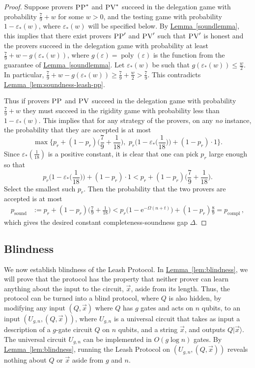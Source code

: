 \documentclass[11pt]{article}
\numberwithin{equation}{section}
\theoremstyle{definition}
\theoremstyle{plain}
\newcommand{\eee}{\mathrm e}
\newcommand{\expref}[2]{\hyperref[#2]{#1~\ref{#2}}}
\newcommand{\ket}[1]{|#1\rangle}
\DeclareMathOperator{\poly}{poly}
\DeclareMathOperator{\sound}{sound}
\DeclareMathOperator{\compl}{compl}
\newcommand{\eps}{\varepsilon}
\newcommand{\pv}{\textsc{PV}}
\newcommand{\pp}{\textsc{PP}}
\begin{document}
\begin{proof}
Suppose provers $\pp^*$ and $\pv^*$ succeed in the delegation game with probability $\frac79+w$ for some $w>0$, and the testing game with probability $1-\eps_*(w)$, where $\eps_*(w)$ will be specified below. By \expref{Lemma}{soundlemma}, this implies that there exist provers $\pp'$ and $\pv'$ such that $\pv'$ is honest and the provers succeed in the delegation game with probability at least $\frac79+w-g(\eps_*(w))$, where $g(\eps) = \poly(\eps)$ is the function from the guarantee of \expref{Lemma}{soundlemma}. Let $\eps_*(w)$ be such that $g(\eps_*(w)) \leq \frac{w}{2}$. In particular, $\frac79+w-g(\eps_*(w)) \geq \frac79+\frac{w}{2}>\frac79$. This contradicts \expref{Lemma}{lem:soundness-leash-pp}. 

Thus if provers $\pp$ and $\pv$ succeed in the delegation game with probability $\frac79+w$ they must succeed in the rigidity game with probability less than $1-\eps_*(w)$. 
This implies that for any strategy of the provers, on any \textit{no} instance, the probability that they are accepted is at most
\begin{equation}
\max\Big\{p_r+(1-p_r)\Big(\frac79+\frac{1}{18}\Big),\,\, p_r\Big(1-\eps_*\Big(\frac{1}{18}\Big)\Big)+(1-p_r)\cdot 1\Big\}.
\end{equation}
Since $\eps_*(\frac{1}{18})$ is a positive constant, it is clear that one can pick $p_r$ large enough so that 
\begin{equation}
p_r\Big(1-\eps_*\Big(\frac{1}{18}\Big)\Big)+(1-p_r)\cdot 1 < p_r+(1-p_r)\Big(\frac79+\frac{1}{18}\Big).
\end{equation}
Select the smallest such $p_r$. Then the probability that the two provers are accepted is at most 
\begin{align*}
p_{\sound} &:= p_r+(1-p_r)\Big(\frac79+\frac{1}{18}\Big)
< p_r\big(1-\eee^{-\Omega(n+t)}\big)+(1-p_r)\frac89 
= p_{\compl} \,,
\end{align*}
which gives the desired constant completeness-soundness gap $\Delta$.
\end{proof}

\subsection{Blindness}
\label{sec:leash-blind}

We now establish blindness of the Leash Protocol. In \expref{Lemma}{lem:blindness}, we will prove that the protocol has the property that neither prover can learn anything about the input to the circuit, $\vec{x}$, aside from its length. Thus, the protocol can be turned into a blind protocol, where $Q$ is also hidden, by modifying any input $(Q,\vec{x})$ where $Q$ has $g$ gates and acts on $n$ qubits, to an input $(U_{g,n},(Q,\vec{x}))$, where $U_{g,n}$ is a universal circuit that takes as input a description of a $g$-gate circuit $Q$ on $n$ qubits, and a string $\vec{x}$, and outputs $Q\ket{\vec{x}}$. The universal circuit $U_{g,n}$ can be implemented in $O(g\log n)$ gates. By \expref{Lemma}{lem:blindness}, running the Leash Protocol on $(U_{g,n},(Q,\vec{x}))$ reveals nothing about $Q$ or $\vec{x}$ aside from $g$ and $n$.
\end{document}
